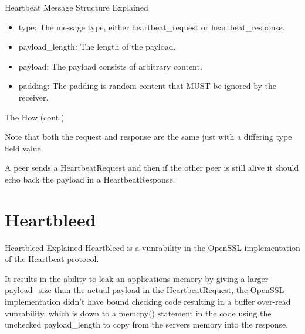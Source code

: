 \documentclass{beamer}
\begin{document}
\begin{frame}{Heartbeat Message Structure Explained}
    \begin{itemize}
        \item

            type:  The message type, either heartbeat\_request or
            heartbeat\_response.


        \item
            payload\_length:  The length of the payload.

        \item
            payload:  The payload consists of arbitrary content.


        \item
            padding:  The padding is random content that MUST be ignored by the
            receiver.
    \end{itemize}

\end{frame}

\begin{frame}{The How (cont.)}

    Note that both the request and response are the same just with a differing type field value.

    A peer sends a HeartbeatRequest and then if the other peer is still alive it should echo
    back the payload in a HeartbeatResponse.

\end{frame}

\section{Heartbleed}
\begin{frame}{Heartbleed Explained}
    Heartbleed is a vunrability in the OpenSSL implementation of the Heartbeat protocol.

    It results in the ability to leak an applications memory by giving a larger payload\_size
    than the actual payload in the HeartbeatRequest, the OpenSSL implementation didn't have
    bound checking code resulting in a buffer over-read vunrability, which is down to a
    memcpy() statement in the code using the unchecked payload\_length to copy from the servers
    memory into the response.

\end{frame}
\end{document}
